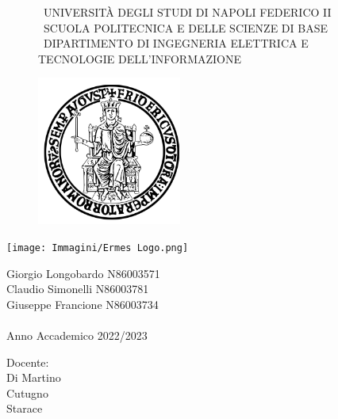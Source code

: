 \documentclass{report}
\begin{document}
    \begin{figure}[htbp!]
    

    \centering\scshape\Medium\ UNIVERSITÀ DEGLI STUDI DI NAPOLI FEDERICO II\\
    \centering\scshape\small\ SCUOLA POLITECNICA E DELLE SCIENZE DI BASE\\
    \centering\scshape\Medium\ DIPARTIMENTO DI INGEGNERIA ELETTRICA E TECNOLOGIE DELL'INFORMAZIONE\\

        \begin{center}
            \includegraphics[width=.25\textwidth]{Immagini/FedericoII.png}
        \end{center}
    \end{figure}

         \begin{center}
     \hspace{-1cm}
            \texttt{[image: Immagini/Ermes Logo.png]} 
        \end{center}
        

    \begin{center}


        Giorgio Longobardo N86003571 \\ Claudio Simonelli N86003781\\ Giuseppe Francione N86003734\\~\\ Anno Accademico 2022/2023
    \end{center}
    
\hspace{0pt}
\vfill
    \raggedleft Docente:\\Di Martino\\Cutugno\\Starace
\vfill
\hspace{0pt}


    
    \newpage

    \tableofcontents

    
    
    
    
    
    
    
\end{document}
